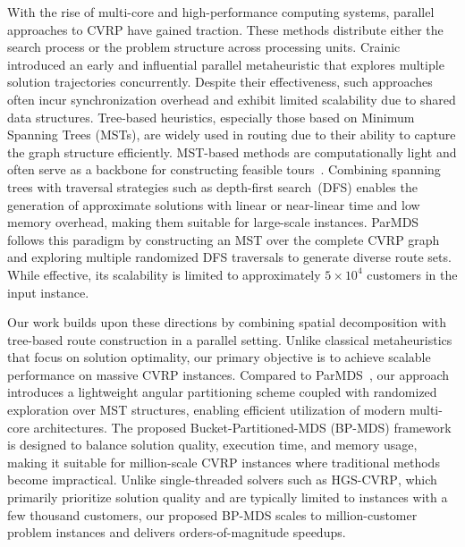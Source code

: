 With the rise of multi-core and high-performance computing systems, parallel approaches to CVRP have gained traction. These methods distribute either the search process or the problem structure across processing units. Crainic~\cite{crainic2006parallel} introduced an early and influential parallel metaheuristic that explores multiple solution trajectories concurrently. Despite their effectiveness, such approaches often incur synchronization overhead and exhibit limited scalability due to shared data structures. Tree-based heuristics, especially those based on Minimum Spanning Trees (MSTs), are widely used in routing due to their ability to capture the graph structure efficiently. MST-based methods are computationally light and often serve as a backbone for constructing feasible tours~\cite{CLRS}. Combining spanning trees with traversal strategies such as depth-first search~(DFS) enables the generation of approximate solutions with linear or near-linear time and low memory overhead, making them suitable for large-scale instances. ParMDS~\cite{Muniasamy_VRP} follows this paradigm by constructing an MST over the complete CVRP graph and exploring multiple randomized DFS traversals to generate diverse route sets. While effective, its scalability is limited to approximately $5\times 10^4$ customers in the input instance.

Our work builds upon these directions by combining spatial decomposition with tree-based route construction in a parallel setting. Unlike classical metaheuristics that focus on solution optimality, our primary objective is to achieve scalable performance on massive CVRP instances. Compared to ParMDS~\cite{Muniasamy_VRP}, our approach introduces a lightweight angular partitioning scheme coupled with randomized exploration over MST structures, enabling efficient utilization of modern multi-core architectures. The proposed Bucket-Partitioned-MDS (BP-MDS) framework is designed to balance solution quality, execution time, and memory usage, making it suitable for million-scale CVRP instances where traditional methods become impractical. Unlike single-threaded solvers such as \textsc{HGS-CVRP}, which primarily prioritize solution quality and are typically limited to instances with a few thousand customers, our proposed \textsc{BP-MDS} scales to million-customer problem instances and delivers orders-of-magnitude speedups.

